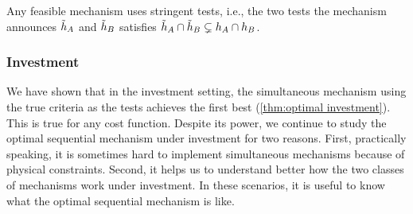 \begin{lemma}\label{lem:stringent tests}
    Any feasible mechanism uses stringent tests, i.e., the two tests the mechanism announces $\tilde{h}_A$ and $\tilde{h}_B$  satisfies $\tilde{h}_A\cap\tilde{h}_B\subsetneq h_A\cap h_B$.
\end{lemma}








\subsubsection{Investment}\label{subsubsec:investment}
We have shown that in the investment setting, the simultaneous mechanism using the true criteria as the tests achieves the first best (\cref{thm:optimal investment}). 
This is true for any cost function.
Despite its power, we continue to study the optimal sequential mechanism under investment for two reasons.
First, practically speaking, it is sometimes hard to implement simultaneous mechanisms because of physical constraints.
Second, it helps us to understand better how the two classes of mechanisms work under investment.
In these scenarios, it is useful to know what the optimal sequential mechanism is like.



